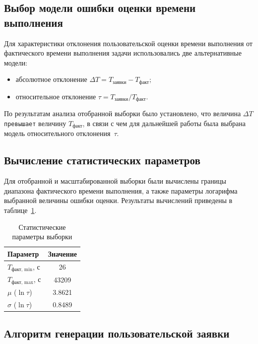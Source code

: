 \subsection{Выбор модели ошибки оценки времени выполнения}

Для характеристики отклонения пользовательской оценки времени
выполнения от фактического времени выполнения задачи использовались
две альтернативные модели:
\begin{itemize}
\item абсолютное отклонение $\Delta T = T_{\text{заявки}} - T_{\text{факт}}$;
\item относительное отклонение $\tau = T_{\text{заявки}} / T_{\text{факт}}$.
\end{itemize}

По результатам анализа отобранной выборки было установлено, что
величина $\Delta T$ \texttt{превышает} величину
$T_{\text{факт}}$, в связи с чем для дальнейшей работы была выбрана
модель относительного отклонения~$\tau$.

\subsection{Вычисление статистических параметров}

Для отобранной и масштабированной выборки были вычислены границы
диапазона фактического времени выполнения, а также параметры
логарифма выбранной величины ошибки оценки. Результаты вычислений
приведены в таблице~\ref{tab:stats}.

\begin{table}[H]
\caption{Статистические параметры выборки}
\label{tab:stats}
\centering
\begin{tabular}{|l|c|}
\hline
Параметр & Значение \\
\hline
$T_{\text{факт, min}}$, с & 26 \\
$T_{\text{факт, max}}$, с & 43209 \\
$\mu$ ($\ln \tau$) & 3.8621 \\
$\sigma$ ($\ln \tau$) & 0.8489 \\
\hline
\end{tabular}
\end{table}

\subsection{Алгоритм генерации пользовательской заявки}

